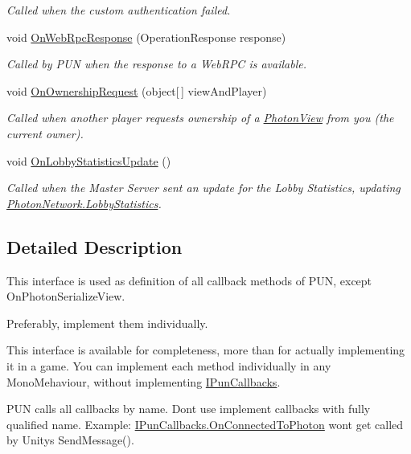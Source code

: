 \begin{DoxyCompactItemize}
\begin{DoxyCompactList}\small\item\em Called when the custom authentication failed. \end{DoxyCompactList}\item 
void \hyperlink{interface_i_pun_callbacks_aae3221aa2d3b999574fc55a6aaee2877}{On\+Web\+Rpc\+Response} (Operation\+Response response)
\begin{DoxyCompactList}\small\item\em Called by P\+UN when the response to a Web\+R\+PC is available. \end{DoxyCompactList}\item 
void \hyperlink{interface_i_pun_callbacks_a02364f5144b6305bbffc886d530b7bd2}{On\+Ownership\+Request} (object\mbox{[}$\,$\mbox{]} view\+And\+Player)
\begin{DoxyCompactList}\small\item\em Called when another player requests ownership of a \hyperlink{class_photon_view}{Photon\+View} from you (the current owner). \end{DoxyCompactList}\item 
void \hyperlink{interface_i_pun_callbacks_a6922987e083f414d05464403e3b94bce}{On\+Lobby\+Statistics\+Update} ()
\begin{DoxyCompactList}\small\item\em Called when the Master Server sent an update for the Lobby Statistics, updating \hyperlink{class_photon_network_abdced09cccf61ae817cb97705ffce137}{Photon\+Network.\+Lobby\+Statistics}. \end{DoxyCompactList}\end{DoxyCompactItemize}


\subsection{Detailed Description}
This interface is used as definition of all callback methods of P\+UN, except On\+Photon\+Serialize\+View. 

Preferably, implement them individually. 

This interface is available for completeness, more than for actually implementing it in a game. You can implement each method individually in any Mono\+Mehaviour, without implementing \hyperlink{interface_i_pun_callbacks}{I\+Pun\+Callbacks}.

P\+UN calls all callbacks by name. Don\textquotesingle{}t use implement callbacks with fully qualified name. Example\+: \hyperlink{interface_i_pun_callbacks_aa9014980a1dc2d9befc6129668c890a2}{I\+Pun\+Callbacks.\+On\+Connected\+To\+Photon} won\textquotesingle{}t get called by Unity\textquotesingle{}s Send\+Message().

